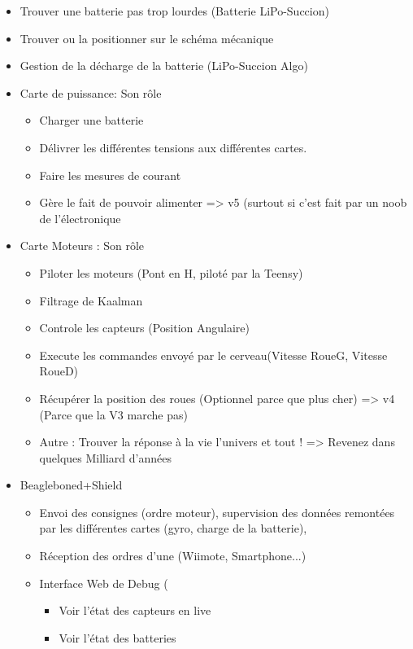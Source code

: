 \documentclass[10pt,a4paper]{article}
\begin{document}
    \begin{itemize}
    	\item Trouver une batterie pas trop lourdes (Batterie LiPo-Succion)
    	\item Trouver ou la positionner sur le schéma mécanique
    	\item Gestion de la décharge de la batterie (LiPo-Succion Algo)
    	\item Carte de puissance: Son rôle
    	\begin{itemize}
        	\item Charger une batterie
        	\item Délivrer les différentes tensions aux différentes cartes.
        	\item Faire les mesures de courant
        	\item Gère le fait de pouvoir alimenter => v5 (surtout si c'est fait par un noob de l'électronique
    	\end{itemize}
    	\item Carte Moteurs : Son rôle
    	\begin{itemize}
        	\item Piloter les moteurs (Pont en H, piloté par la Teensy)
        	\item Filtrage de Kaalman
        	\item Controle les capteurs (Position Angulaire)
        	\item Execute les commandes envoyé par le cerveau(Vitesse RoueG, Vitesse RoueD)
        	\item Récupérer la position des roues (Optionnel parce que plus cher) => v4 (Parce que la V3 marche pas)
        	\item Autre : Trouver la réponse à la vie l'univers et tout ! => Revenez dans quelques Milliard d'années
    	\end{itemize}
    	\item  Beagleboned+Shield
    	\begin{itemize}
        	\item Envoi des consignes (ordre moteur), supervision des données remontées par les différentes cartes (gyro, charge de la batterie),
        	\item Réception des ordres d'une (Wiimote, Smartphone...)
        	\item Interface Web de Debug (
            	\begin{itemize}
            		\item Voir l'état des capteurs en live
            		\item Voir l'état des batteries

\end{itemize}
\end{itemize}
\end{itemize}
\end{document}
